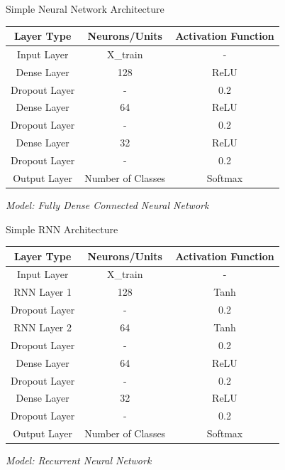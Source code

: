  

 
 


\begin{frame}{Simple Neural Network Architecture}
	\centering
	\small
	\begin{tabular}{|c|c|c|}
		\hline
		\textbf{Layer Type} & \textbf{Neurons/Units} & \textbf{Activation Function} \\
		\hline
		Input Layer & X\_train & - \\
		\hline
		Dense Layer & 128 & ReLU \\
		\hline
		Dropout Layer & - & 0.2 \\
		\hline
		Dense Layer & 64 & ReLU \\
		\hline
		Dropout Layer & - & 0.2 \\
		\hline
		Dense Layer & 32 & ReLU \\
		\hline
		Dropout Layer & - & 0.2 \\
		\hline
		Output Layer & Number of Classes & Softmax \\
		\hline
	\end{tabular}
	
	\vspace{1em}
	\textit{Model:  Fully Dense Connected Neural Network}
\end{frame}


\begin{frame}{Simple RNN Architecture}
	\centering
	\small
	\begin{tabular}{|c|c|c|}
		\hline
		\textbf{Layer Type} & \textbf{Neurons/Units} & \textbf{Activation Function} \\
		\hline
		Input Layer & X\_train & - \\
		\hline
		RNN Layer 1 & 128 & Tanh \\
		\hline
		Dropout Layer & - & 0.2 \\
		\hline
		RNN Layer 2 & 64 & Tanh \\
		\hline
		Dropout Layer & - & 0.2 \\
		\hline
		Dense Layer & 64 & ReLU \\
		\hline
		Dropout Layer & - & 0.2 \\
		\hline
		Dense Layer & 32 & ReLU \\
		\hline
		Dropout Layer & - & 0.2 \\
		\hline
		Output Layer & Number of Classes & Softmax \\
		\hline
	\end{tabular}
	
	\vspace{1em}
	\textit{Model:  Recurrent Neural Network}
\end{frame}



